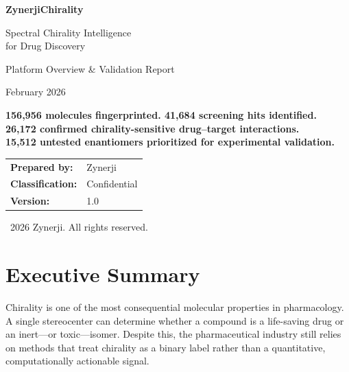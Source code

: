 \documentclass[11pt,a4paper]{article}
\begin{document}
\begin{titlepage}
\centering
\vspace*{2cm}

{\Huge\bfseries\color{zynerji} ZynerjiChirality\par}
\vspace{0.5cm}
{\Large\color{darktext} Spectral Chirality Intelligence\\for Drug Discovery\par}

\vspace{1.5cm}

{\large\color{gray} Platform Overview \& Validation Report\par}
\vspace{0.3cm}
{\normalsize February 2026\par}

\vspace{3cm}

\begin{keyresult}
\centering
\textbf{156,956 molecules fingerprinted. 41,684 screening hits identified.}\\[4pt]
\textbf{26,172 confirmed chirality-sensitive drug--target interactions.}\\[4pt]
\textbf{15,512 untested enantiomers prioritized for experimental validation.}
\end{keyresult}

\vspace{2cm}

\begin{tabular}{ll}
\textbf{Prepared by:} & Zynerji \\
\textbf{Classification:} & Confidential \\
\textbf{Version:} & 1.0 \\
\end{tabular}

\vfill
{\small\color{gray}\textcopyright\ 2026 Zynerji. All rights reserved.}
\end{titlepage}

{
\setcounter{tocdepth}{1}  %
\tableofcontents
}
\newpage

\section{Executive Summary}

Chirality is one of the most consequential molecular properties in pharmacology.
A single stereocenter can determine whether a compound is a life-saving drug or
an inert---or toxic---isomer. Despite this, the pharmaceutical industry still
relies on methods that treat chirality as a binary label rather than a
quantitative, computationally actionable signal.
\end{document}
